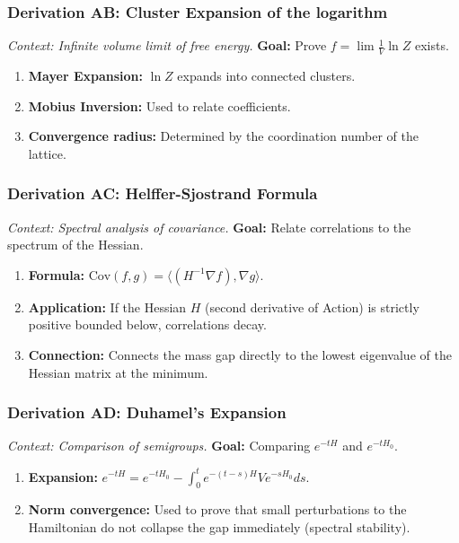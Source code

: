 \subsubsection{Derivation AB: Cluster Expansion of the logarithm}
\textit{Context: Infinite volume limit of free energy.}
\textbf{Goal:} Prove $f = \lim \frac{1}{V} \ln Z$ exists.
\begin{enumerate}
    \item \textbf{Mayer Expansion:} $\ln Z$ expands into connected clusters.
    \item \textbf{Mobius Inversion:} Used to relate coefficients.
    \item \textbf{Convergence radius:} Determined by the coordination number of the lattice.
\end{enumerate}

\subsubsection{Derivation AC: Helffer-Sjostrand Formula}
\textit{Context: Spectral analysis of covariance.}
\textbf{Goal:} Relate correlations to the spectrum of the Hessian.
\begin{enumerate}
    \item \textbf{Formula:} $\text{Cov}(f,g) = \langle (H^{-1} \nabla f), \nabla g \rangle$.
    \item \textbf{Application:} If the Hessian $H$ (second derivative of Action) is strictly positive bounded below, correlations decay.
    \item \textbf{Connection:} Connects the mass gap directly to the lowest eigenvalue of the Hessian matrix at the minimum.
\end{enumerate}

\subsubsection{Derivation AD: Duhamel's Expansion}
\textit{Context: Comparison of semigroups.}
\textbf{Goal:} Comparing $e^{-tH}$ and $e^{-tH_0}$.
\begin{enumerate}
    \item \textbf{Expansion:} $e^{-tH} = e^{-tH_0} - \int_0^t e^{-(t-s)H} V e^{-sH_0} ds$.
    \item \textbf{Norm convergence:} Used to prove that small perturbations to the Hamiltonian do not collapse the gap immediately (spectral stability).
\end{enumerate}

